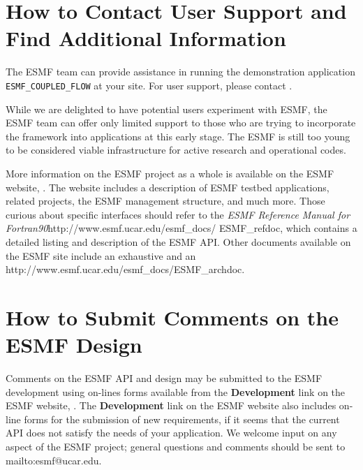 \section{How to Contact User Support and Find Additional Information}
\label{sec:Support}
The ESMF team can provide assistance in running the demonstration application 
{\tt ESMF\_COUPLED\_FLOW} at your site.  For user support, please contact 
.  

While we are delighted to have potential users experiment with ESMF, the
ESMF team can offer only limited support to those who are trying to incorporate 
the framework into applications at this early stage.  The ESMF is still
too young to be considered viable infrastructure for active research and 
operational codes.  

More information on the ESMF project as a whole is available on the 
ESMF website, .  
The website includes a description of ESMF testbed applications, related projects,
the ESMF management structure, and much more.  Those curious about specific 
interfaces should refer to the \htmladdnormallink
{{\it ESMF Reference Manual for Fortran90}}{http://www.esmf.ucar.edu/esmf_docs/
ESMF_refdoc}, which contains a detailed listing and description of 
the ESMF API.  Other documents available on the ESMF site include an exhaustive
and an 
{http://www.esmf.ucar.edu/esmf_docs/ESMF_archdoc}.

\section{How to Submit Comments on the ESMF Design}
\label{sec:Submission}
Comments on the ESMF API and design may be submitted to the ESMF development 
using on-lines forms available from the {\bf Development} link on the ESMF 
website, .  
The {\bf Development} 
link on the ESMF website also includes on-line forms for the submission of 
new requirements, if it seems that the current API does not satisfy the needs of 
your application.  We welcome input on any aspect of the ESMF project; general
questions and comments should be sent to 
{mailto:esmf@ucar.edu}.







